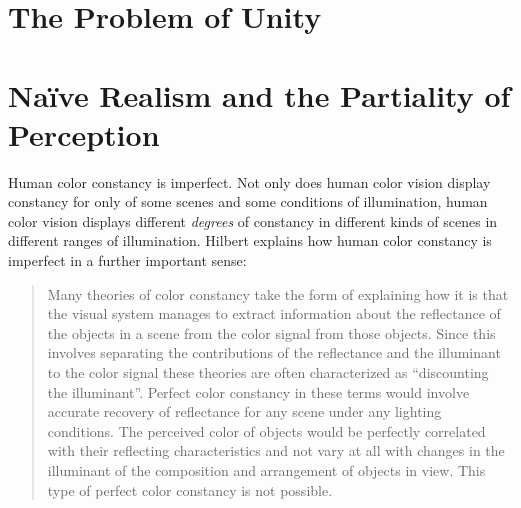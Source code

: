 \documentclass[12pt]{article}
\begin{document}
\section{The Problem of Unity} %
\label{sec:the_problem_of_unity}




\section{Naïve Realism and the Partiality of Perception} %
\label{sec:naïve_realism_and_the_partiality_of_perception}

Human color constancy is imperfect. Not only does human color vision display constancy for only of some scenes and some conditions of illumination, human color vision displays different \emph{degrees} of constancy in different kinds of scenes in different ranges of illumination. Hilbert explains how human color constancy is imperfect in a further important sense:
	\begin{quote}
		Many theories of color constancy take the form of explaining how it is that the visual system manages to extract information about the reflectance of the objects in a scene from the color signal from those objects. Since this involves separating the contributions of the reflectance and the illuminant to the color signal these theories are often characterized as ``discounting the illuminant''. Perfect color constancy in these terms would involve accurate recovery of reflectance for any scene under any lighting conditions. The perceived color of objects would be perfectly correlated with their reflecting characteristics and not vary at all with changes in the illuminant of the composition and arrangement of objects in view. This type of perfect color constancy is not possible. \citep[143]{Hilbert:2007qy}
	\end{quote}
\end{document}
